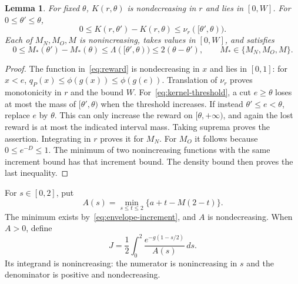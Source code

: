 \documentclass[11pt]{article}
\numberwithin{equation}{section}
\newtheorem{lemma}[theorem]{Lemma}
\theoremstyle{definition}
\begin{document}
\begin{lemma}\label{lem:kernel-properties}
For fixed $\theta$, $K(r,\theta)$ is nondecreasing in $r$ and lies in
$[0,W]$. For $0\le\theta'\le\theta$,
\begin{equation}\label{eq:kernel-threshold}
 0\le K(r,\theta')-K(r,\theta)
       \le\nu_r([\theta',\theta)).
\end{equation}
Each of $M_N,M_O,M$ is nonincreasing, takes values in $[0,W]$, and
satisfies
\begin{equation}\label{eq:envelope-increment}
 0\le M_*(\theta')-M_*(\theta)
       \le\Lambda([\theta',\theta))\le2(\theta-\theta'),
 \qquad M_*\in\{M_N,M_O,M\}.
\end{equation}
\end{lemma}
\begin{proof}
The function in~\eqref{eq:reward} is nondecreasing in $x$ and lies in
$[0,1]$: for $x<e$, $q_P(x)\le\phi(g(x))\le\phi(g(e))$.
Translation of $\nu_r$ proves monotonicity in $r$ and the bound $W$.
For~\eqref{eq:kernel-threshold}, a cut $e\ge\theta$ loses at most the
mass of $[\theta',\theta)$ when the threshold increases. If instead
$\theta'\le e<\theta$, replace $e$ by $\theta$. This can only increase
the reward on $[\theta,+\infty)$, and again the lost reward is at most
the indicated interval mass. Taking suprema proves the assertion.
Integrating in $r$ proves it for $M_N$. For $M_O$ it follows because
$0\le e^{-D}\le1$. The minimum of two nonincreasing functions with the
same increment bound has that increment bound. The density bound then
proves the last inequality.
\end{proof}

For $s\in[0,2]$, put
\begin{equation}\label{eq:analytic-capacity}
 A(s)=\min_{s\le t\le2}\{a+t-M(2-t)\}.
\end{equation}
The minimum exists by~\eqref{eq:envelope-increment}, and $A$ is
nondecreasing. When $A>0$, define
\begin{equation}\label{eq:integral-J}
 J=\frac12\int_0^2\frac{e^{-g(1-s/2)}}{A(s)}\,ds.
\end{equation}
Its integrand is nonincreasing: the numerator is nonincreasing in $s$
and the denominator is positive and nondecreasing.
\end{document}
